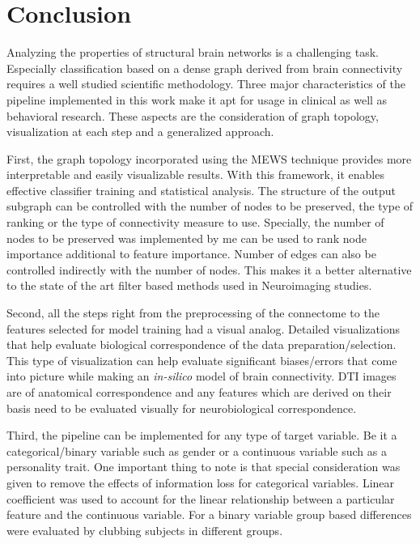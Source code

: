 \documentclass[msthesis.tex]{subfiles}
\begin{document}
\chapter{Conclusion}
\iffalse
Interpretability-accuracy tradeoff. 
With the solver - 42 features (10 nodes)
with the baseline - much more number of nodes for the same features.
\fi
Analyzing the properties of structural brain networks is a challenging task. Especially classification based on a dense graph derived from brain connectivity requires a well studied scientific methodology. Three major characteristics of the pipeline implemented in this work make it apt for usage in clinical as well as behavioral research. These aspects are the consideration of graph topology, visualization at each step and a generalized approach. 

First, the graph topology incorporated using the MEWS technique provides more interpretable and easily visualizable results. With this framework, it enables effective classifier training and statistical analysis. The structure of the output subgraph can be controlled with the number of nodes to be preserved, the type of ranking or the type of connectivity measure to use. Specially, the number of nodes to be preserved was implemented by me can be used to rank node importance additional to feature importance. Number of edges can also be controlled indirectly with the number of nodes. This makes it a better alternative to the state of the art filter based methods used in Neuroimaging studies. 

Second, all the steps right from the preprocessing of the connectome to the features selected for model training had a visual analog. Detailed visualizations that help evaluate biological correspondence of the data preparation/selection. This type of visualization can help evaluate significant biases/errors that come into picture while making an \textit{in-silico} model of brain connectivity. DTI images are of anatomical correspondence and any features which are derived on their basis need to be evaluated visually for neurobiological correspondence. 

Third, the pipeline can be implemented for any type of target variable. Be it a categorical/binary variable such as gender or a continuous variable such as a personality trait. One important thing to note is that special consideration was given to remove the effects of information loss for categorical variables. Linear coefficient was used to account for the linear relationship between a particular feature and the continuous variable. For a binary variable group based differences were evaluated by clubbing subjects in different groups. 
\end{document}
